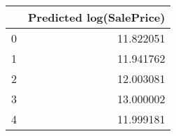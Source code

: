 \begin{tabular}{lr}
\toprule
{} &  Predicted log(SalePrice) \\
\midrule
0 &                 11.822051 \\
1 &                 11.941762 \\
2 &                 12.003081 \\
3 &                 13.000002 \\
4 &                 11.999181 \\
\bottomrule
\end{tabular}
